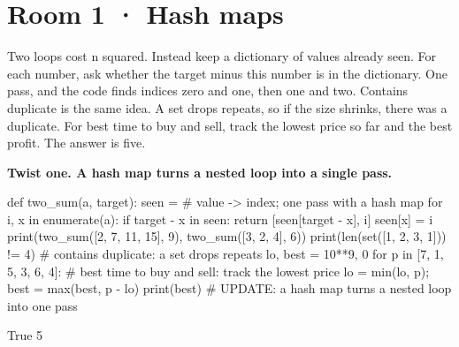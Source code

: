 \documentclass[11pt,a4paper]{report}
\begin{document}
\section*{Room 1 · Hash maps}
Two loops cost n squared. Instead keep a dictionary of values already seen. For each number, ask whether the target minus this number is in the dictionary. One pass, and the code finds indices zero and one, then one and two. Contains duplicate is the same idea. A set drops repeats, so if the size shrinks, there was a duplicate. For best time to buy and sell, track the lowest price so far and the best profit. The answer is five.
\begin{tcolorbox}[colback=yellow!12,colframe=orange!70!black,boxrule=0.4pt,left=4pt,right=4pt,top=2pt,bottom=2pt]\textbf{Twist one. A hash map turns a nested loop into a single pass.}\end{tcolorbox}
\begin{Code}
def two_sum(a, target):
    seen = {}                               # value -> index; one pass with a hash map
    for i, x in enumerate(a):
        if target - x in seen: return [seen[target - x], i]
        seen[x] = i
print(two_sum([2, 7, 11, 15], 9), two_sum([3, 2, 4], 6))
print(len(set([1, 2, 3, 1])) != 4)          # contains duplicate: a set drops repeats
lo, best = 10**9, 0
for p in [7, 1, 5, 3, 6, 4]:                # best time to buy and sell: track the lowest price
    lo = min(lo, p); best = max(best, p - lo)
print(best)
# UPDATE: a hash map turns a nested loop into one pass
\end{Code}
\begin{Out}
[0, 1] [1, 2]
True
5
\end{Out}
\end{document}
